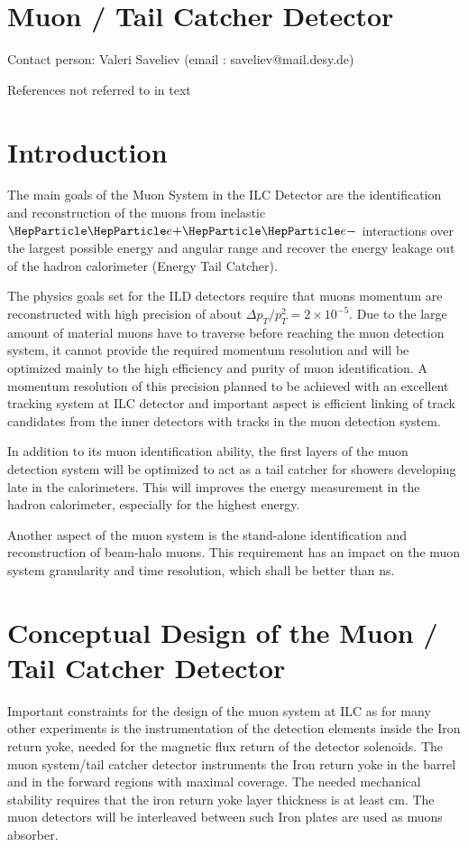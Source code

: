 \section{Muon / Tail Catcher Detector}
Contact person: Valeri Saveliev (email : saveliev@mail.desy.de)

{\color{red} References not referred to in text}

\section{Introduction}
The main goals of the Muon System in the ILC Detector are the identification and reconstruction of the muons from inelastic $\Pep\Pem$ interactions over the largest possible energy and angular range and recover the energy leakage out of the hadron calorimeter (Energy Tail Catcher).

The physics goals set for the ILD detectors require that muons momentum are reconstructed with high precision of about $\Delta p_T/p^2_T = 2 \times10^{-5}$.
Due to the large amount of material muons have to traverse before reaching the muon detection system,  it cannot provide the required  momentum resolution and will be optimized mainly to the high efficiency and purity of muon identification.
A momentum resolution of this precision planned to be achieved with an excellent tracking system at ILC detector and important aspect is efficient linking of track candidates from the inner detectors with tracks in the muon detection system.

In addition to its muon identification ability, the first layers of the muon detection system will be optimized to act as a tail catcher for showers developing late in the calorimeters. This will improves the energy measurement in the hadron calorimeter, especially for the highest energy.

Another aspect of the muon system is the stand-alone identification and reconstruction of beam-halo muons. This requirement has an impact on the muon system granularity and time resolution, which shall be better than \unit[1]{ns}.

\section{Conceptual Design of the Muon / Tail Catcher Detector}
Important constraints for the design of the muon system at ILC  as for many other experiments is the instrumentation of the detection elements inside the Iron return yoke, needed for the magnetic flux return of the detector solenoids.
The muon system/tail catcher detector instruments the Iron return yoke in the barrel and in the forward regions with maximal coverage.
The needed mechanical stability requires that the iron return yoke layer thickness is at least \unit[10]{cm}.
The muon detectors will be interleaved between such Iron plates are used as muons absorber.

